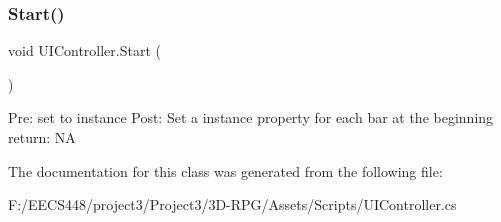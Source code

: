 \subsubsection{\texorpdfstring{Start()}{Start()}}
{\footnotesize\ttfamily void U\+I\+Controller.\+Start (\begin{DoxyParamCaption}{ }\end{DoxyParamCaption})\hspace{0.3cm}{\ttfamily [private]}}

Pre\+: set to instance Post\+: Set a instance property for each bar at the beginning return\+: NA 

The documentation for this class was generated from the following file\+:\begin{DoxyCompactItemize}
\item 
F\+:/\+E\+E\+C\+S448/project3/\+Project3/3\+D-\/\+R\+P\+G/\+Assets/\+Scripts/U\+I\+Controller.\+cs\end{DoxyCompactItemize}
